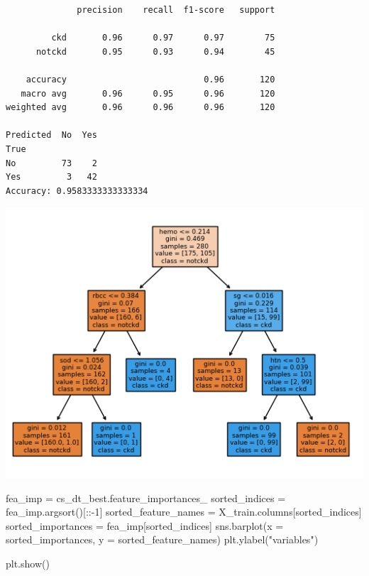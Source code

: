 \documentclass[
  11pt,
  letterpaper,
  DIV=11,
  numbers=noendperiod]{scrartcl}
\newenvironment{Shaded}{\begin{snugshade}}{\end{snugshade}}
\newcommand{\DecValTok}[1]{\textcolor[rgb]{0.68,0.00,0.00}{#1}}
\newcommand{\NormalTok}[1]{\textcolor[rgb]{0.00,0.23,0.31}{#1}}
\newcommand{\OperatorTok}[1]{\textcolor[rgb]{0.37,0.37,0.37}{#1}}
\newcommand{\StringTok}[1]{\textcolor[rgb]{0.13,0.47,0.30}{#1}}
\begin{document}
\begin{verbatim}
              precision    recall  f1-score   support

         ckd       0.96      0.97      0.97        75
      notckd       0.95      0.93      0.94        45

    accuracy                           0.96       120
   macro avg       0.96      0.95      0.96       120
weighted avg       0.96      0.96      0.96       120

Predicted  No  Yes
True              
No         73    2
Yes         3   42
Accuracy: 0.9583333333333334
\end{verbatim}

\includegraphics{Assignment6_Final version_files/figure-pdf/cell-33-output-2.png}

\begin{Shaded}
\begin{Highlighting}[]
\NormalTok{fea\_imp }\OperatorTok{=}\NormalTok{ cs\_dt\_best.feature\_importances\_}
\NormalTok{sorted\_indices }\OperatorTok{=}\NormalTok{ fea\_imp.argsort()[::}\OperatorTok{{-}}\DecValTok{1}\NormalTok{]}
\NormalTok{sorted\_feature\_names }\OperatorTok{=}\NormalTok{ X\_train.columns[sorted\_indices]}
\NormalTok{sorted\_importances }\OperatorTok{=}\NormalTok{ fea\_imp[sorted\_indices]}
\NormalTok{sns.barplot(x }\OperatorTok{=}\NormalTok{ sorted\_importances, y }\OperatorTok{=}\NormalTok{ sorted\_feature\_names)}
\NormalTok{plt.ylabel(}\StringTok{"variables"}\NormalTok{)}

\NormalTok{plt.show()}
\end{Highlighting}
\end{Shaded}
\end{document}
